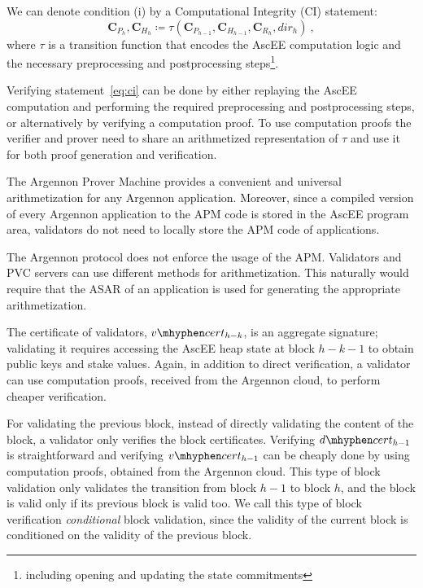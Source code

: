 We can denote condition (i) by a Computational Integrity (CI) statement:
\begin{equation}
    \label{eq:ci}
    \mathbf{C}_{P_h},\mathbf{C}_{H_h} \coloneqq \tau(\mathbf{C}_{P_{h-1}},\mathbf{C}_{H_{h-1}},\mathbf{C}_{R_{h}},
    dir_h)\ ,
\end{equation}
where $\tau$ is a transition function that encodes the AscEE computation logic and the necessary preprocessing and
postprocessing steps\footnote{including opening and updating the state commitments}.

Verifying statement~\ref{eq:ci} can be done by either replaying the AscEE computation and performing the required
preprocessing and postprocessing steps, or alternatively by
verifying a computation proof. To use computation proofs the verifier and prover need to share an arithmetized
representation of $\tau$ and use it for both proof generation and verification.

The Argennon Prover Machine provides a convenient and universal arithmetization for any Argennon
application. Moreover, since a compiled version of every Argennon application to the APM code is stored in the AscEE
program area, validators do not need to locally store the APM code of applications.

The Argennon protocol does not enforce the usage of the APM. Validators and PVC servers can use different methods
for arithmetization. This naturally would require that the ASAR of an application is used
for generating the appropriate arithmetization.

The certificate of validators, $v \mhyphen cert_{h-k}$, is an aggregate signature; validating it requires accessing the
AscEE heap state at block $h-k-1$ to obtain public keys and stake values. Again, in addition to direct verification,
a validator can use computation proofs, received from the Argennon cloud, to perform cheaper verification.

For validating the previous block, instead of directly validating the content of the block, a validator only
verifies the block certificates. Verifying $d \mhyphen cert_{h-1}$ is straightforward and verifying $v \mhyphen
cert_{h-1}$ can be cheaply done by using computation proofs, obtained from the Argennon cloud. This type of block
validation only validates the transition from block $h-1$ to block $h$, and the block is valid only if its previous
block is valid too. We
call this type of block verification \emph{conditional} block validation, since the validity of the current block is
conditioned on the validity of the previous block.

